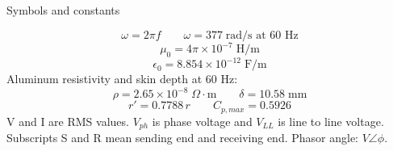 Symbols and constants

$$\omega=2\pi f\qquad \omega=377\;\text{rad/s at 60 Hz}$$
$$\mu_0=4\pi\times10^{-7}\;\text{H/m}$$
$$\epsilon_0=8.854\times10^{-12}\;\text{F/m}$$
Aluminum resistivity and skin depth at 60 Hz:
$$\rho=2.65\times10^{-8}\;\Omega\cdot\text{m}\qquad \delta=10.58\;\text{mm}$$
$$r'=0.7788\,r\qquad C_{p,max}=0.5926$$
V and I are RMS values. $V_{ph}$ is phase voltage and $V_{LL}$ is line to line voltage. Subscripts S and R mean sending end and receiving end. Phasor angle: $V\angle\phi$.
